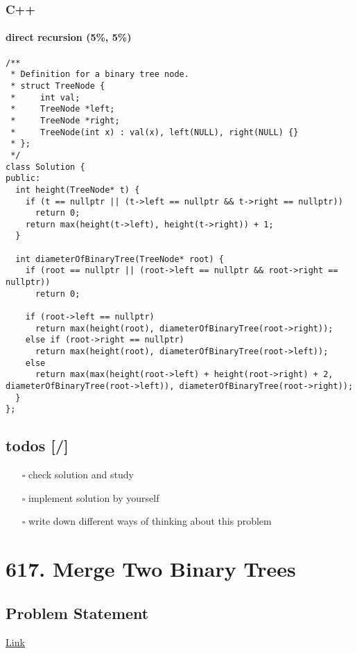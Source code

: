 \documentclass[12pt]{book}
\begin{document}
\subsection{C++}
\label{sec:orgaa71056}
\subsubsection{direct recursion (5\%, 5\%)}
\label{sec:orgad65596}
\begin{verbatim}
/**
 * Definition for a binary tree node.
 * struct TreeNode {
 *     int val;
 *     TreeNode *left;
 *     TreeNode *right;
 *     TreeNode(int x) : val(x), left(NULL), right(NULL) {}
 * };
 */
class Solution {
public:
  int height(TreeNode* t) {
    if (t == nullptr || (t->left == nullptr && t->right == nullptr))
      return 0; 
    return max(height(t->left), height(t->right)) + 1;
  }

  int diameterOfBinaryTree(TreeNode* root) {
    if (root == nullptr || (root->left == nullptr && root->right == nullptr))
      return 0;

    if (root->left == nullptr)
      return max(height(root), diameterOfBinaryTree(root->right));
    else if (root->right == nullptr)
      return max(height(root), diameterOfBinaryTree(root->left));
    else
      return max(max(height(root->left) + height(root->right) + 2, diameterOfBinaryTree(root->left)), diameterOfBinaryTree(root->right));
  }
};

\end{verbatim}

\section{todos [/]}
\label{sec:org5e76a61}
\begin{itemize}
\item[{$\square$}] check solution and study
\item[{$\square$}] implement solution by yourself
\item[{$\square$}] write down different ways of thinking about this problem
\end{itemize}
\chapter{617. Merge Two Binary Trees}
\label{sec:orgf5010d5}
\section{Problem Statement}
\label{sec:orgb2a9ede}
\href{https://leetcode.com/problems/merge-two-binary-trees/}{Link}
\end{document}
